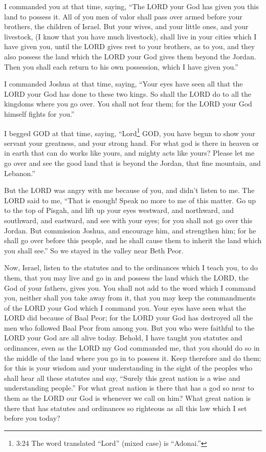 \myverse{}I commanded you at that time, saying, “The LORD your God has
given you this land to possess it. All of you men of valor shall pass over armed before your brothers,
the children of Israel.
\myverse{}But your wives, and your little ones, and your livestock, (I know that you
have much livestock), shall live in your cities which I have given you,
\myverse{}until the LORD gives rest to your brothers, as to you, and they also possess
the land which the LORD your God gives them beyond the Jordan. Then you shall each return to his own possession,
which I have given you.”


\myverse{}I commanded Joshua at that time, saying, “Your eyes have seen
all that the LORD your God has done to these two kings. So shall the LORD do to all the kingdoms where
you go over.
\myverse{}You shall not fear them; for the LORD your God himself fights for you.”


\myverse{}I begged GOD at that time, saying,
\myverse{}“Lord\footnote{3:24 The word translated “Lord” (mixed case) is “Adonai.”} GOD, you have begun to show your
servant your greatness, and your strong hand. For what god is there in heaven or in earth that can do
works like yours, and mighty acts like yours?
\myverse{}Please let me go over and see the good land that is beyond the Jordan, that
fine mountain, and Lebanon.”


\myverse{}But the LORD was angry with me because of you, and didn’t listen
to me. The LORD said to me, “That is enough! Speak no more to me of this matter.
\myverse{}Go up to the top of Pisgah, and lift up your eyes westward, and northward,
and southward, and eastward, and see with your eyes; for you shall not go over this Jordan.
\myverse{}But commission Joshua, and encourage him, and strengthen him; for he shall
go over before this people, and he shall cause them to inherit the land which you shall see.”
\myverse{}So we stayed in the valley near Beth Peor.


\mychapter{} \myverse*{}Now, Israel, listen to the statutes and to the ordinances which
I teach you, to do them, that you may live and go in and possess the land which the LORD, the God of your
fathers, gives you.
\myverse{}You shall not add to the word which I command you, neither shall you take away
from it, that you may keep the commandments of the LORD your God which I command you.
\myverse{}Your eyes have seen what the LORD did because of Baal Peor; for the LORD your
God has destroyed all the men who followed Baal Peor from among you.
\myverse{}But you who were faithful to the LORD your God are all alive today.
\myverse{}Behold, I have taught you statutes and ordinances, even as the LORD my God commanded
me, that you should do so in the middle of the land where you go in to possess it.
\myverse{}Keep therefore and do them; for this is your wisdom and your understanding in
the sight of the peoples who shall hear all these statutes and say, “Surely this great nation is a wise
and understanding people.”
\myverse{}For what great nation is there that has a god so near to them as the LORD our
God is whenever we call on him?
\myverse{}What great nation is there that has statutes and ordinances so righteous as
all this law which I set before you today?


